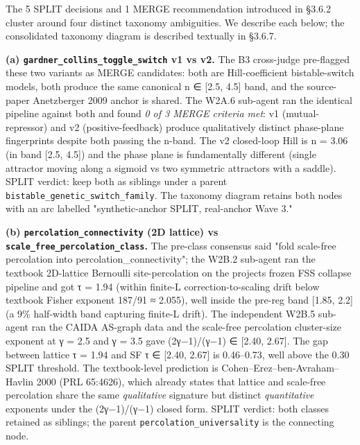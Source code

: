 \documentclass[
  11pt]{article}
\begin{document}
The 5 SPLIT decisions and 1 MERGE recommendation introduced in §3.6.2
cluster around four distinct taxonomy ambiguities. We describe each
below; the consolidated taxonomy diagram is described textually in
§3.6.7.

\textbf{(a) \texttt{gardner\_collins\_toggle\_switch} v1 vs v2.} The B3
cross-judge pre-flagged these two variants as MERGE candidates: both are
Hill-coefficient bistable-switch models, both produce the same canonical
n ∈ {[}2.5, 4.5{]} band, and the source-paper Anetzberger 2009 anchor is
shared. The W2A.6 sub-agent ran the identical pipeline against both and
found \emph{0 of 3 MERGE criteria met}: v1 (mutual-repressor) and
v2 (positive-feedback) produce qualitatively distinct phase-plane
fingerprints despite both passing the n-band. The v2 closed-loop Hill is
n = 3.06 (in band {[}2.5, 4.5{]}) and the phase plane is fundamentally
different (single attractor moving along a sigmoid vs two symmetric
attractors with a saddle). SPLIT verdict: keep both as siblings under a
parent \texttt{bistable\_genetic\_switch\_family}. The taxonomy diagram
retains both nodes with an arc labelled "synthetic-anchor SPLIT,
real-anchor Wave 3."

\textbf{(b) \texttt{percolation\_connectivity} (2D lattice) vs
\texttt{scale\_free\_percolation\_class}.} The pre-class consensus said
"fold scale-free percolation into percolation\_connectivity"; the W2B.2
sub-agent ran the textbook 2D-lattice Bernoulli site-percolation on the
project\textquotesingle s frozen FSS collapse pipeline and got τ = 1.94
(within finite-L correction-to-scaling drift below textbook Fisher
exponent 187/91 ≈ 2.055), well inside the pre-reg band {[}1.85, 2.2{]}
(a 9\% half-width band capturing finite-L drift). The independent W2B.5
sub-agent ran the CAIDA AS-graph data and the scale-free percolation
cluster-size exponent at γ = 2.5 and γ = 3.5 gave (2γ−1)/(γ−1) ∈
{[}2.40, 2.67{]}. The gap between lattice τ = 1.94 and SF τ ∈ {[}2.40,
2.67{]} is 0.46--0.73, well above the 0.30 SPLIT threshold. The
textbook-level prediction is Cohen--Erez--ben-Avraham--Havlin 2000
(PRL 65:4626), which already states that lattice and scale-free
percolation share the same \emph{qualitative} signature but distinct
\emph{quantitative} exponents under the (2γ−1)/(γ−1) closed form. SPLIT
verdict: both classes retained as siblings; the parent
\texttt{percolation\_universality} is the connecting node.
\end{document}
